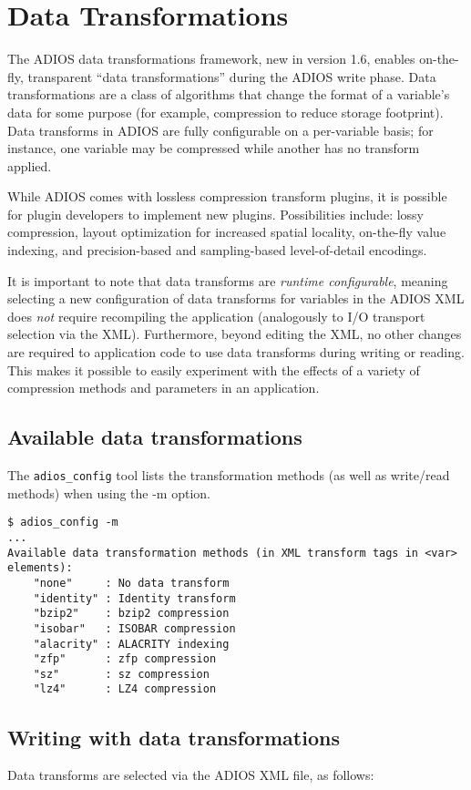 \chapter{Data Transformations}
\label{sec:transform_plugins}
The ADIOS data transformations framework, new in version 1.6, enables on-the-fly, transparent ``data transformations'' during the ADIOS
write phase. Data transformations are a class of algorithms that change the format of a variable's data for some purpose
(for example, compression to reduce storage footprint).
Data transforms in ADIOS are fully configurable on a per-variable basis; for instance, one variable
may be compressed while another has no transform applied.

While ADIOS comes with lossless compression transform plugins, it is possible for plugin developers to implement new plugins.
Possibilities include: lossy compression, layout optimization for increased spatial locality,
on-the-fly value indexing, and precision-based and sampling-based level-of-detail encodings.

It is important to note that data transforms are \emph{runtime configurable}, meaning selecting a new configuration of data
transforms for variables in the ADIOS XML does \emph{not} require recompiling the application (analogously to I/O transport
selection via the XML). Furthermore, beyond editing the XML, no other changes are required to application code to use data
transforms during writing or reading. This makes it possible to easily experiment with the effects of a variety of compression
methods and parameters in an application.

\section{Available data transformations}
The \verb+adios_config+ tool lists the transformation methods (as well as write/read methods) when using the -m option.

\begin{lstlisting}
$ adios_config -m
...
Available data transformation methods (in XML transform tags in <var> elements):
    "none"     : No data transform
    "identity" : Identity transform
    "bzip2"    : bzip2 compression
    "isobar"   : ISOBAR compression
    "alacrity" : ALACRITY indexing
    "zfp"      : zfp compression
    "sz"       : sz compression
    "lz4"      : LZ4 compression
\end{lstlisting}


\section{Writing with data transformations}
Data transforms are selected via the ADIOS XML file, as follows:


